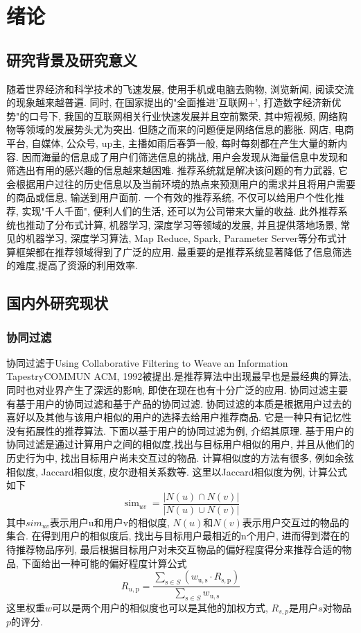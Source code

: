 \chapter{绪论}

\section{研究背景及研究意义}
随着世界经济和科学技术的飞速发展, 使用手机或电脑去购物, 浏览新闻, 阅读交流的现象越来越普遍. 同时, 在国家提出的"全面推进'互联网+', 打造数字经济新优势"的口号下, 我国的互联网相关行业快速发展并且空前繁荣, 
其中短视频, 网络购物等领域的发展势头尤为突出. 但随之而来的问题便是网络信息的膨胀. 网店, 电商平台, 自媒体, 公众号, up主, 主播如雨后春笋一般, 每时每刻都在产生大量的新内容. 因而海量的信息成了用户们筛选信息的挑战, 用户会发现从海量信息中发现和筛选出有用的感兴趣的信息越来越困难. 推荐系统就是解决该问题的有力武器, 它会根据用户过往的历史信息以及当前环境的热点来预测用户的需求并且将用户需要的商品或信息, 输送到用户面前. 一个有效的推荐系统, 不仅可以给用户个性化推荐, 实现"千人千面", 便利人们的生活, 还可以为公司带来大量的收益. 此外推荐系统也推动了分布式计算, 机器学习, 深度学习等领域的发展, 并且提供落地场景, 常见的机器学习, 深度学习算法, Map Reduce, Spark, Parameter Server等分布式计算框架都在推荐领域得到了广泛的应用. 最重要的是推荐系统显著降低了信息筛选的难度,提高了资源的利用效率. 
\section{国内外研究现状}
\subsection{协同过滤}
协同过滤于Using Collaborative Filtering to Weave an Information TapestryCOMMUN ACM, 1992被提出.是推荐算法中出现最早也是最经典的算法, 同时也对业界产生了深远的影响, 即使在现在也有十分广泛的应用. 协同过滤主要有基于用户的协同过滤和基于产品的协同过滤. 协同过滤的本质是根据用户过去的喜好以及其他与该用户相似的用户的选择去给用户推荐商品. 它是一种只有记忆性没有拓展性的推荐算法. 下面以基于用户的协同过滤为例, 介绍其原理.
基于用户的协同过滤是通过计算用户之间的相似度,找出与目标用户相似的用户, 并且从他们的历史行为中, 找出目标用户尚未交互过的物品. 计算相似度的方法有很多, 例如余弦相似度, Jaccard相似度, 皮尔逊相关系数等. 这里以Jaccard相似度为例, 计算公式如下
\begin{equation}
	\operatorname{sim}_{u v}=\frac{|N(u) \cap N(v)|}{|N(u) \cup N(v)|}
\end{equation}
其中$sim_{uv}$表示用户u和用户v的相似度, $N(u)$和$N(v)$表示用户交互过的物品的集合. 在得到用户的相似度后, 找出与目标用户最相近的n个用户, 进而得到潜在的待推荐物品序列, 最后根据目标用户对未交互物品的偏好程度得分来推荐合适的物品, 下面给出一种可能的偏好程度计算公式
\begin{equation}
	R_{u, \mathrm{p}}=\frac{\sum_{\mathrm{s} \in S}\left(w_{\mathrm{u}, \mathrm{s}} \cdot R_{\mathrm{s}, \mathrm{p}}\right)}{\sum_{\mathrm{s} \in S} w_{\mathrm{u}, \mathrm{s}}}
\end{equation}
这里权重$w$可以是两个用户的相似度也可以是其他的加权方式, $R_{s,p}$是用户$s$对物品$p$的评分.
